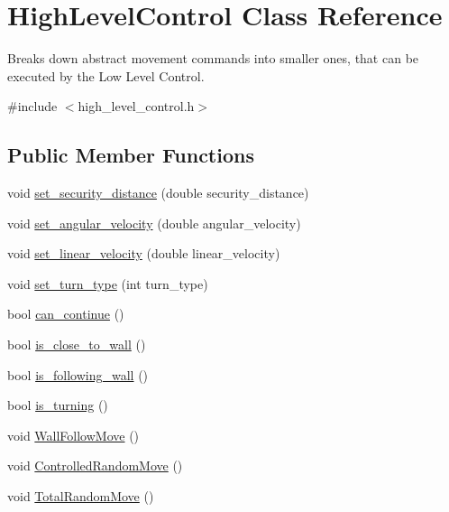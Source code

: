 \hypertarget{classHighLevelControl}{\section{High\-Level\-Control Class Reference}
\label{classHighLevelControl}
}


Breaks down abstract movement commands into smaller ones, that can be executed by the Low Level Control.  




{\ttfamily \#include $<$high\-\_\-level\-\_\-control.\-h$>$}

\subsection*{Public Member Functions}
\begin{DoxyCompactItemize}
\item 
void \hyperlink{classHighLevelControl_aac1848a3223d2a4441a54c00cb4e3af6}{set\-\_\-security\-\_\-distance} (double security\-\_\-distance)
\item 
void \hyperlink{classHighLevelControl_a15fd2a5a71a2dfee668153fa217dd4a3}{set\-\_\-angular\-\_\-velocity} (double angular\-\_\-velocity)
\item 
void \hyperlink{classHighLevelControl_a9e0d860131c93c51b54bbf741fb87c84}{set\-\_\-linear\-\_\-velocity} (double linear\-\_\-velocity)
\item 
void \hyperlink{classHighLevelControl_a3d6185ee401e05141c4c8ce504f7fd74}{set\-\_\-turn\-\_\-type} (int turn\-\_\-type)
\item 
bool \hyperlink{classHighLevelControl_ac66b63d8f13f54a2e4a13da35c0701b0}{can\-\_\-continue} ()
\item 
bool \hyperlink{classHighLevelControl_ab958c89bc1762671d14b967b15dccfb8}{is\-\_\-close\-\_\-to\-\_\-wall} ()
\item 
bool \hyperlink{classHighLevelControl_acfa4985eb2022acd8b59886657877acf}{is\-\_\-following\-\_\-wall} ()
\item 
bool \hyperlink{classHighLevelControl_a72337bf999829a3fc0752bdfe419f97d}{is\-\_\-turning} ()
\item 
void \hyperlink{classHighLevelControl_ab1d5093f7707ff78368af39f5db38575}{Wall\-Follow\-Move} ()
\item 
void \hyperlink{classHighLevelControl_aa2ecdf510640a8bd7cb76ecd4a28a814}{Controlled\-Random\-Move} ()
\item 
void \hyperlink{classHighLevelControl_a58b9c0a66518e0fcd5461fe2eba25d9a}{Total\-Random\-Move} ()
\end{DoxyCompactItemize}


